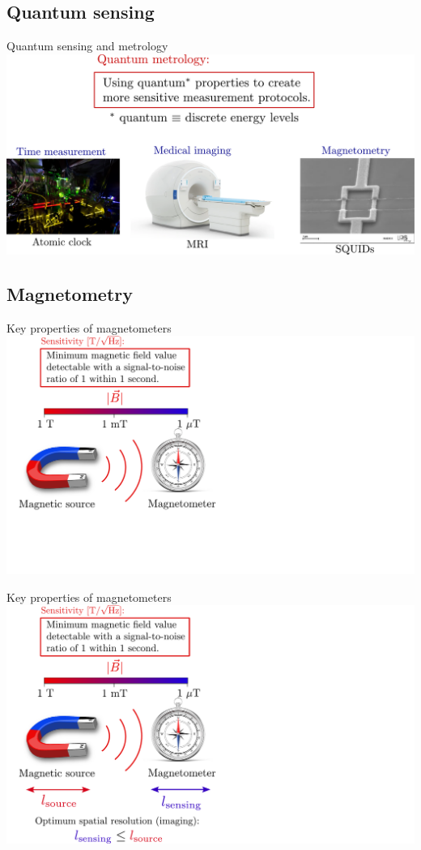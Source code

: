 \documentclass{beamer}
\begin{document}
\subsection{Quantum sensing}
\begin{frame}{Quantum sensing and metrology}
\centering
\includegraphics[width=\textwidth,height=0.85\textheight,keepaspectratio]{Slide_quantum_metrology}
\end{frame}

\subsection{Magnetometry}
\begin{frame}{Key properties of magnetometers}
\centering
\includegraphics[width=\textwidth,height=0.85\textheight,keepaspectratio]{Slide_magnetometer_size_f-2}
\end{frame}

\begin{frame}{Key properties of magnetometers}
\centering
\includegraphics[width=\textwidth,height=0.85\textheight,keepaspectratio]{Slide_magnetometer_size_f-1}
\end{frame}
\end{document}
